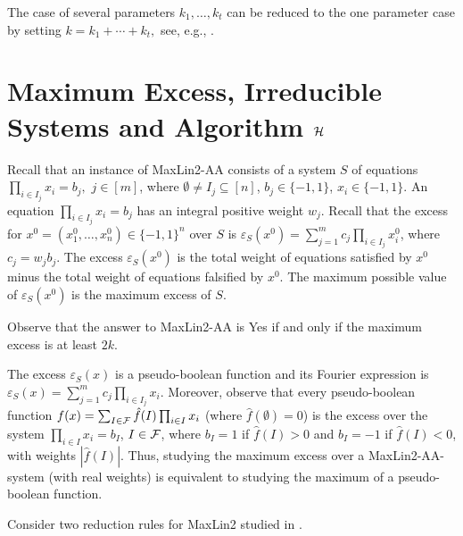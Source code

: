 \documentclass{llncs}
\begin{document}
The case of several parameters $k_1,\ldots ,k_t$ can be reduced to the one parameter case by setting $k=k_1+\cdots +k_t,$ see, e.g., \cite{DLS09}.

\section{Maximum Excess, Irreducible Systems and Algorithm $\cal H$}\label{sec:H}


Recall that an instance of {\sc MaxLin2-AA} consists of a system $S$ of equations
$\prod_{i \in I_j}x_i = b_j,$ $j\in [m]$, where $\emptyset \neq I_j\subseteq [n]$, $b_j \in \{-1, 1\}$, $x_i\in \{-1, 1\}.$ An equation $\prod_{i \in I_j}x_i = b_j$ has an integral positive weight $w_{j}$. Recall that the excess for $x^0=(x^0_1,\ldots ,x^0_n)\in \{-1, 1\}^n$ over $S$ is $\varepsilon_S(x^0)=\sum_{j=1}^m c_j\prod_{i\in I_j}x^0_i$, where $c_j=w_{j}b_j$. The excess $\varepsilon_S(x^0)$ is the total weight of  equations satisfied by $x^0$
minus the total weight of equations falsified by $x^0$. The maximum possible value of $\varepsilon_S(x^0)$ is the maximum excess of $S$.

\begin{remark} \label{MaxLinExcess} Observe that the answer to {\sc MaxLin2-AA} is {\sc Yes} if and only if
the maximum excess is at least $2k$. \end{remark}

\begin{remark} \label{PseudoBExcess} The excess $\varepsilon_S(x)$ is a pseudo-boolean function and its Fourier expression
is  $\varepsilon_S(x)=\sum_{j=1}^m c_j\prod_{i\in I_j}x_i$. Moreover, observe that every pseudo-boolean function
$f(x)=\sum_{I\in {\cal F}}\hat{f}(I)\prod_{i\in I}x_i$ (where $\hat{f}(\emptyset)=0$) is the excess over the
system $\prod_{i\in I}x_i=b_I$, $I\in {\cal F}$, where $b_I=1$ if $\hat{f}(I)>0$ and $b_I=-1$ if $\hat{f}(I)<0$,
with weights $|\hat{f}(I)|.$ Thus, studying the maximum excess over a {\sc MaxLin2-AA}-system (with real weights)
is equivalent to studying the maximum of a pseudo-boolean function. \end{remark}

Consider two reduction rules for {\sc MaxLin2} studied in \cite{GutKimSzeYeo11}.
\end{document}
